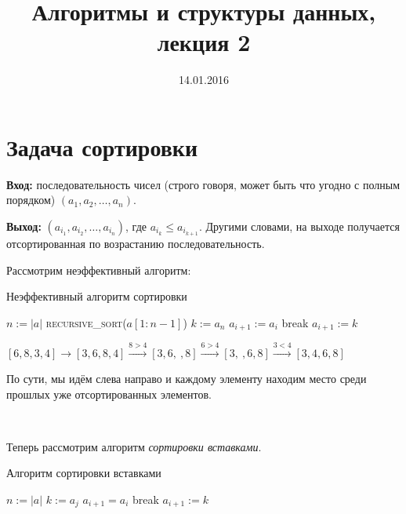 ﻿\documentclass[12pt,a4paper]{article}
\title{Алгоритмы и структуры данных, лекция 2}
\date{14.01.2016}
\author{}
\begin{document}
\maketitle

\section*{Задача сортировки}
\textbf{Вход:} последовательность чисел (строго говоря, может быть что угодно с полным порядком) $(a_1, a_2, \ldots, a_n)$.

\textbf{Выход:} $(a_{i_1}, a_{i_2}, \ldots, a_{i_n})$, где $a_{i_k} \leq a_{i_{k+1}}$. Другими словами, на выходе получается отсортированная по возрастанию последовательность. 

Рассмотрим неэффективный алгоритм:

\begin{algorithm}
\caption{Неэффективный алгоритм сортировки}
\begin{algorithmic}[1]
\State $n \mathrel{:=} |a|$
    \State \textsc{recursive\_sort}($a[1:n-1]$)
    \State $k \mathrel{:=} a_n$
            \State $a_{i+1} \mathrel{:=} a_{i}$
        \Else
            \State break
        \EndIf
        \State $a_{i+1} \mathrel{:=} k$
    \EndFor
\EndIf
\EndFunction
\end{algorithmic}
\end{algorithm}

$[6,8,3,4] \to [3,6,8,4] \xrightarrow{8>4} [3,6,\ ,8] \xrightarrow{6>4}[3,\ ,6,8] \xrightarrow {3<4}[3,4,6,8]$

По сути, мы идём слева направо и каждому элементу находим место среди прошлых уже отсортированных элементов.

\

Теперь рассмотрим алгоритм \emph{сортировки вставками}.

\begin{algorithm}
\caption{Алгоритм сортировки вставками}
\begin{algorithmic}[1]
\State $n \mathrel{:=} |a|$
    \State $k \mathrel{:=} a_j$
            \State $a_{i+1} = a_i$
        \Else
            \State break
        \EndIf
        \State $a_{i+1} \mathrel{:=} k$
    \EndFor
\EndFor
\EndFunction
\end{algorithmic}
\end{algorithm}
\end{document}
